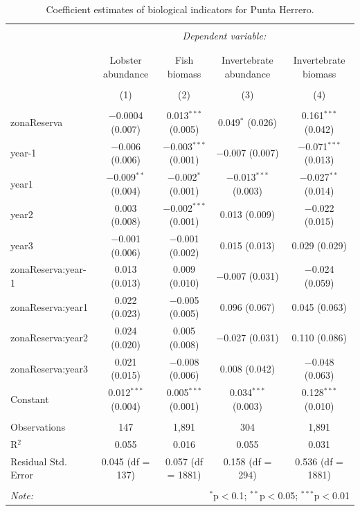 \documentclass[utf8]{frontiers_suppmat} %
\begin{document}
\clearpage

\begin{table}[!htbp] \centering 
  \caption{Coefficient estimates of biological indicators for Punta Herrero.} 
  \label{} 
\small 
\begin{tabular}{@{\extracolsep{1pt}}lcccc} 
\\[-1.8ex]\hline 
\hline \\[-1.8ex] 
 & \multicolumn{4}{c}{\textit{Dependent variable:}} \\ 
\cline{2-5} 
\\[-1.8ex] & \multicolumn{4}{c}{} \\ 
 & Lobster abundance & Fish biomass & Invertebrate abundance & Invertebrate biomass \\ 
\\[-1.8ex] & (1) & (2) & (3) & (4)\\ 
\hline \\[-1.8ex] 
 zonaReserva & $-$0.0004 (0.007) & 0.013$^{***}$ (0.005) & 0.049$^{*}$ (0.026) & 0.161$^{***}$ (0.042) \\ 
  year-1 & $-$0.006 (0.006) & $-$0.003$^{***}$ (0.001) & $-$0.007 (0.007) & $-$0.071$^{***}$ (0.013) \\ 
  year1 & $-$0.009$^{**}$ (0.004) & $-$0.002$^{*}$ (0.001) & $-$0.013$^{***}$ (0.003) & $-$0.027$^{**}$ (0.014) \\ 
  year2 & 0.003 (0.008) & $-$0.002$^{***}$ (0.001) & 0.013 (0.009) & $-$0.022 (0.015) \\ 
  year3 & $-$0.001 (0.006) & $-$0.001 (0.002) & 0.015 (0.013) & 0.029 (0.029) \\ 
  zonaReserva:year-1 & 0.013 (0.013) & 0.009 (0.010) & $-$0.007 (0.031) & $-$0.024 (0.059) \\ 
  zonaReserva:year1 & 0.022 (0.023) & $-$0.005 (0.005) & 0.096 (0.067) & 0.045 (0.063) \\ 
  zonaReserva:year2 & 0.024 (0.020) & 0.005 (0.008) & $-$0.027 (0.031) & 0.110 (0.086) \\ 
  zonaReserva:year3 & 0.021 (0.015) & $-$0.008 (0.006) & 0.008 (0.042) & $-$0.048 (0.063) \\ 
  Constant & 0.012$^{***}$ (0.004) & 0.005$^{***}$ (0.001) & 0.034$^{***}$ (0.003) & 0.128$^{***}$ (0.010) \\ 
 \hline \\[-1.8ex] 
Observations & 147 & 1,891 & 304 & 1,891 \\ 
R$^{2}$ & 0.055 & 0.016 & 0.055 & 0.031 \\ 
Residual Std. Error & 0.045 (df = 137) & 0.057 (df = 1881) & 0.158 (df = 294) & 0.536 (df = 1881) \\ 
\hline 
\hline \\[-1.8ex] 
\textit{Note:}  & \multicolumn{4}{r}{$^{*}$p$<$0.1; $^{**}$p$<$0.05; $^{***}$p$<$0.01} \\ 
\end{tabular} 
\end{table}
\end{document}
